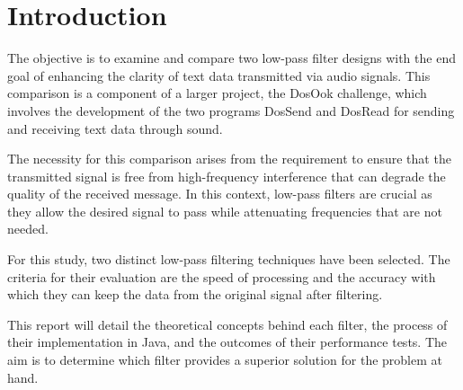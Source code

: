 \chapter{Introduction}

The objective is to examine and compare two low-pass filter designs with the end goal of enhancing the clarity of text data transmitted via audio signals. This comparison is a component of a larger project, the DosOok challenge, which involves the development of the two programs DosSend and DosRead for sending and receiving text data through sound.

The necessity for this comparison arises from the requirement to ensure that the transmitted signal is free from high-frequency interference that can degrade the quality of the received message. In this context, low-pass filters are crucial as they allow the desired signal to pass while attenuating frequencies that are not needed.

For this study, two distinct low-pass filtering techniques have been selected. The criteria for their evaluation are the speed of processing and the accuracy with which they can keep the data from the original signal after filtering.

This report will detail the theoretical concepts behind each filter, the process of their implementation in Java, and the outcomes of their performance tests. The aim is to determine which filter provides a superior solution for the problem at hand.